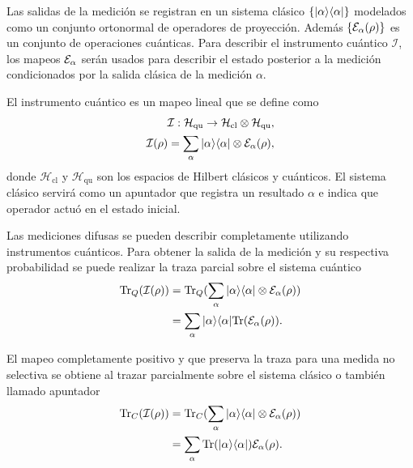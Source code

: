 Las salidas de la medición se registran en un sistema clásico $\{|\alpha\rangle \langle
\alpha |\}$ modelados como un conjunto ortonormal de operadores de proyección.
Además $\{\mathcal{E}_\alpha(\rho)\}$ es un conjunto de operaciones cuánticas. Para
describir el instrumento cuántico $\mathcal{I}$, los mapeos $\mathcal{E}_\alpha$ serán
usados para describir  el estado posterior a la medición condicionados por la
salida clásica de la medición $\alpha$. 



El instrumento cuántico es un mapeo lineal que se define como
\begin{equation}
    \begin{split}
        \mathcal{I}: \mathcal{H}_{\text{qu}}\rightarrow\mathcal{H}_{\text{cl}}\otimes \mathcal{H}_{\text{qu}},\\
    \mathcal{I}(\rho)=\sum_\alpha |\alpha\rangle \langle\alpha|\otimes \mathcal{E}_\alpha(\rho),
    \end{split}
\end{equation}
donde $\mathcal{H}_{\text{cl}}$ y $\mathcal{H}_{\text{qu}}$ son los espacios de Hilbert clásicos y cuánticos. El sistema clásico servirá como un apuntador que registra un resultado
$\alpha$ e indica que operador actuó en el estado inicial.


Las mediciones difusas se pueden describir completamente utilizando instrumentos cuánticos. Para obtener la salida de la medición y su respectiva probabilidad se puede realizar la traza parcial sobre el sistema cuántico \begin{equation}
    \begin{split}
        {\rm Tr}_Q(\mathcal{I}(\rho))&={\rm Tr}_Q(\sum_\alpha |\alpha\rangle \langle\alpha|\otimes \mathcal{E}_\alpha(\rho))\\
        &=\sum_\alpha |\alpha\rangle \langle\alpha|{\rm Tr}(\mathcal{E}_\alpha(\rho)).
    \end{split}
\end{equation}

El mapeo completamente positivo y que preserva la traza para una medida no selectiva se obtiene al trazar parcialmente sobre el sistema clásico o también llamado apuntador\begin{equation}
    \begin{split}
        {\rm Tr}_C(\mathcal{I}(\rho))&={\rm Tr}_C(\sum_\alpha |\alpha\rangle \langle\alpha|\otimes \mathcal{E}_\alpha(\rho))\\
        &=\sum_\alpha {\rm Tr}(|\alpha\rangle \langle\alpha|)\mathcal{E}_\alpha(\rho).
    \end{split}
\end{equation}


